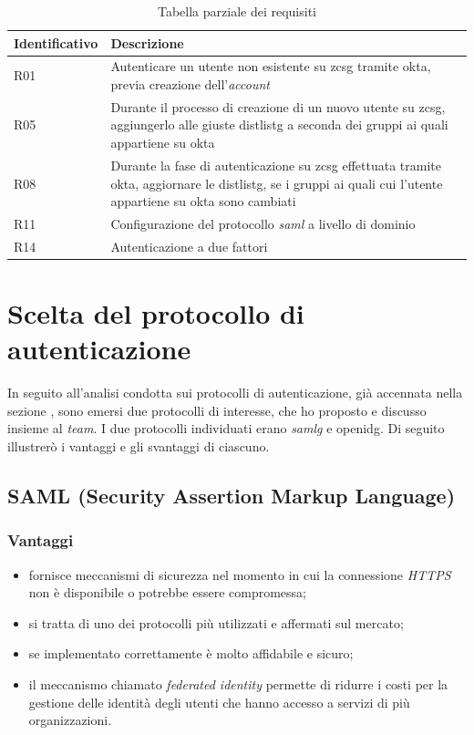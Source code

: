 \begin{center}
    \begin{table}[h]
    \def\arraystretch{2}
    \begin{tabular}{| p{3cm} | p{9cm} |} %
        \hline
        \textbf{Identificativo} & \textbf{Descrizione} \\ \hline  
        R01 & Autenticare un utente non esistente su \gls{zcsg} tramite \gls{okta}, previa creazione dell'\textit{account}\\ \hline
        R05 & Durante il processo di creazione di un nuovo utente su \gls{zcsg}, aggiungerlo alle giuste \gls{distlistg} a seconda dei gruppi ai quali appartiene su \gls{okta}\\ \hline
        R08 & Durante la fase di autenticazione su \gls{zcsg} effettuata tramite \gls{okta}, aggiornare le \gls{distlistg}, se i gruppi ai quali cui l'utente appartiene su \gls{okta} sono cambiati\\ \hline
        R11 & Configurazione del protocollo \textit{\gls{saml}} a livello di dominio\\ \hline
        R14 & Autenticazione a due fattori\\ \hline 
    \end{tabular}
    \caption{Tabella parziale dei requisiti}
    \end{table}
\end{center}

\section{Scelta del protocollo di autenticazione}
In seguito all'analisi condotta sui protocolli di autenticazione, già accennata nella sezione , sono emersi due protocolli di interesse, che ho proposto e discusso insieme al \textit{team}.
I due protocolli individuati erano \textit{\gls{samlg}} e \gls{openidg}. Di seguito illustrerò i vantaggi e gli svantaggi di ciascuno.

\subsection{SAML (Security Assertion Markup Language)}
    \subsubsection{Vantaggi}
    \begin{itemize}
        \item fornisce meccanismi di sicurezza nel momento in cui la connessione \textit{HTTPS} non è disponibile o potrebbe essere compromessa;
        \item si tratta di uno dei protocolli più utilizzati e affermati sul mercato;
        \item se implementato correttamente è molto affidabile e sicuro;
        \item il meccanismo chiamato \textit{federated identity} permette di ridurre i costi per la gestione delle identità degli utenti che hanno accesso a servizi di più organizzazioni.
    \end{itemize}
